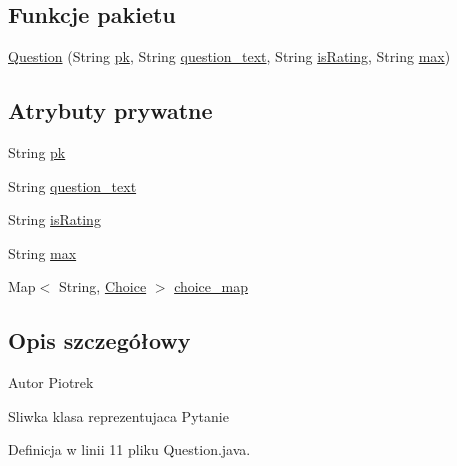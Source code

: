 \subsection*{Funkcje pakietu}
\begin{DoxyCompactItemize}
\item 
\hyperlink{classcom_1_1example_1_1qrpoll_1_1_question_aeeae84aca53cbbce8820daf91436564c}{Question} (String \hyperlink{classcom_1_1example_1_1qrpoll_1_1_question_ab94e31e243d24239faf4ae4c68c28f0b}{pk}, String \hyperlink{classcom_1_1example_1_1qrpoll_1_1_question_ab90d61211a23303be8fe8139aed31754}{question\+\_\+text}, String \hyperlink{classcom_1_1example_1_1qrpoll_1_1_question_a7b9016a004baf976a3d700ce332c0e1b}{is\+Rating}, String \hyperlink{classcom_1_1example_1_1qrpoll_1_1_question_a07bd283882253cc7c9ab69718a692a64}{max})
\end{DoxyCompactItemize}
\subsection*{Atrybuty prywatne}
\begin{DoxyCompactItemize}
\item 
String \hyperlink{classcom_1_1example_1_1qrpoll_1_1_question_ab94e31e243d24239faf4ae4c68c28f0b}{pk}
\item 
String \hyperlink{classcom_1_1example_1_1qrpoll_1_1_question_ab90d61211a23303be8fe8139aed31754}{question\+\_\+text}
\item 
String \hyperlink{classcom_1_1example_1_1qrpoll_1_1_question_a7b9016a004baf976a3d700ce332c0e1b}{is\+Rating}
\item 
String \hyperlink{classcom_1_1example_1_1qrpoll_1_1_question_a07bd283882253cc7c9ab69718a692a64}{max}
\item 
Map$<$ String, \hyperlink{classcom_1_1example_1_1qrpoll_1_1_choice}{Choice} $>$ \hyperlink{classcom_1_1example_1_1qrpoll_1_1_question_aa382153815db46e065ab637ef86f9265}{choice\+\_\+map}
\end{DoxyCompactItemize}


\subsection{Opis szczegółowy}
\begin{DoxyAuthor}{Autor}
Piotrek 

Sliwka klasa reprezentujaca Pytanie 
\end{DoxyAuthor}


Definicja w linii 11 pliku Question.\+java.



